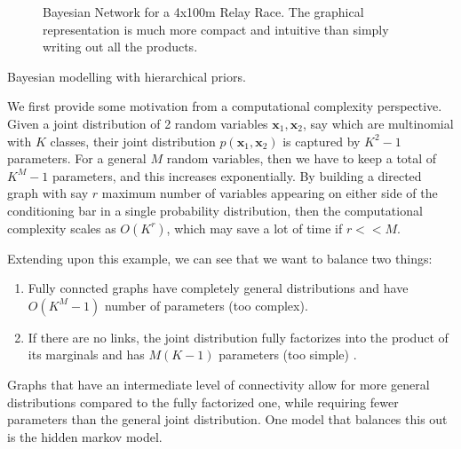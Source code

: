 \documentclass{article}
\begin{document}
\begin{example}
\begin{figure}[H]
      \caption{Bayesian Network for a 4x100m Relay Race. The graphical representation is much more compact and intuitive than simply writing out all the products. }
      \label{fig:relay_race}
    \end{figure}
  \end{example} 

  Bayesian modelling with hierarchical priors. 

  \begin{example}[Multinomial]
    We first provide some motivation from a computational complexity perspective. Given a joint distribution of 2 random variables $\mathbf{x}_1, \mathbf{x}_2$, say which are multinomial with $K$ classes, their joint distribution $p(\mathbf{x}_1, \mathbf{x}_2)$ is captured by $K^2 - 1$ parameters. For a general $M$ random variables, then we have to keep a total of $K^M - 1$ parameters, and this increases exponentially. By building a directed graph with say $r$ maximum number of variables appearing on either side of the conditioning bar in a single probability distribution, then the computational complexity scales as $O(K^r)$, which may save a lot of time if $r << M$. 
  \end{example}

  Extending upon this example, we can see that we want to balance two things: 
  \begin{enumerate} 
    \item Fully conncted graphs have completely general distributions and have $O(K^M -1)$ number of parameters (too complex). 
    \item If there are no links, the joint distribution fully factorizes into the product of its marginals and has $M(K-1)$ parameters (too simple) . 
  \end{enumerate}
  Graphs that have an intermediate level of connectivity allow for more general distributions compared to the fully factorized one, while requiring fewer parameters than the general joint distribution. One model that balances this out is the hidden markov model. 
\end{document}
